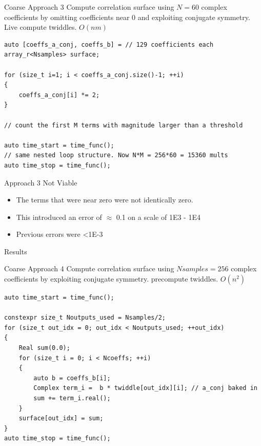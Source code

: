 \begin{frame}[fragile]{Coarse Approach 3}
	Compute correlation surface using $N=60$ complex coefficients by omitting coefficients near $0$ and exploiting conjugate symmetry. Live compute twiddles. $O(nm)$
	
	\begin{lstlisting}[basicstyle=\ttfamily\scriptsize, 
		linebackgroundcolor={%
			\ifnum\value{lstnumber}=1 \color{yellow!30}\fi
			\ifnum\value{lstnumber}=6 \color{yellow!30}\fi
			\ifnum\value{lstnumber}=9 \color{yellow!30}\fi
		}]
auto [coeffs_a_conj, coeffs_b] = // 129 coefficients each
array_r<Nsamples> surface;

for (size_t i=1; i < coeffs_a_conj.size()-1; ++i)
{
	coeffs_a_conj[i] *= 2;
}

// count the first M terms with magnitude larger than a threshold

auto time_start = time_func();
// same nested loop structure. Now N*M = 256*60 = 15360 mults
auto time_stop = time_func();
	\end{lstlisting}
	
\end{frame}

\begin{frame}{Approach 3 Not Viable}
	\begin{itemize}
		\item The terms that were near zero were not identically zero. 
		\item This introduced an error of $\approx$ 0.1 on a scale of 1E3 - 1E4
		\item Previous errors were \textless 1E-3
	\end{itemize}
\end{frame}

\begin{frame}{Results}
\end{frame}


\begin{frame}[fragile]{Coarse Approach 4}
	Compute correlation surface using $Nsamples=256$ complex coefficients by exploiting conjugate symmetry. precompute twiddles. $O(n^2)$
	
	\begin{lstlisting}[basicstyle=\ttfamily\scriptsize, 
		linebackgroundcolor={%
			\ifnum\value{lstnumber}=10 \color{yellow!30}\fi
		}]
auto time_start = time_func();

constexpr size_t Noutputs_used = Nsamples/2;
for (size_t out_idx = 0; out_idx < Noutputs_used; ++out_idx)
{
	Real sum(0.0);
	for (size_t i = 0; i < Ncoeffs; ++i)
	{
		auto b = coeffs_b[i];
		Complex term_i =  b * twiddle[out_idx][i]; // a_conj baked in
		sum += term_i.real();
	}
	surface[out_idx] = sum;
}
auto time_stop = time_func();
	\end{lstlisting}
	
\end{frame}


